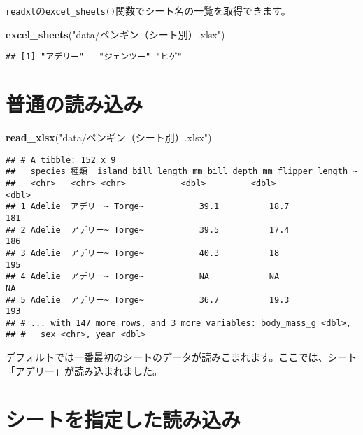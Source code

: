 \documentclass[
  xelatex,ja=standard, b5paper]{bxjsbook}
\newenvironment{Shaded}{\begin{snugshade}}{\end{snugshade}}
\newcommand{\KeywordTok}[1]{\textcolor[rgb]{0.13,0.29,0.53}{\textbf{#1}}}
\newcommand{\NormalTok}[1]{#1}
\newcommand{\StringTok}[1]{\textcolor[rgb]{0.31,0.60,0.02}{#1}}
\begin{document}
\texttt{readxl}の\texttt{excel\_sheets()}関数でシート名の一覧を取得できます。

\begin{Shaded}
\begin{Highlighting}[]
\KeywordTok{excel_sheets}\NormalTok{(}\StringTok{"data/ペンギン（シート別）.xlsx"}\NormalTok{)}
\end{Highlighting}
\end{Shaded}

\begin{verbatim}
## [1] "アデリー"   "ジェンツー" "ヒゲ"
\end{verbatim}

\hypertarget{ux666eux901aux306eux8aadux307fux8fbcux307f}{%
\section{普通の読み込み}\label{ux666eux901aux306eux8aadux307fux8fbcux307f}}

\begin{Shaded}
\begin{Highlighting}[]
\KeywordTok{read_xlsx}\NormalTok{(}\StringTok{"data/ペンギン（シート別）.xlsx"}\NormalTok{)}
\end{Highlighting}
\end{Shaded}

\begin{verbatim}
## # A tibble: 152 x 9
##   species 種類  island bill_length_mm bill_depth_mm flipper_length_~
##   <chr>   <chr> <chr>           <dbl>         <dbl>            <dbl>
## 1 Adelie  アデリー~ Torge~           39.1          18.7              181
## 2 Adelie  アデリー~ Torge~           39.5          17.4              186
## 3 Adelie  アデリー~ Torge~           40.3          18                195
## 4 Adelie  アデリー~ Torge~           NA            NA                 NA
## 5 Adelie  アデリー~ Torge~           36.7          19.3              193
## # ... with 147 more rows, and 3 more variables: body_mass_g <dbl>,
## #   sex <chr>, year <dbl>
\end{verbatim}

デフォルトでは一番最初のシートのデータが読みこまれます。ここでは、シート「アデリー」が読み込まれました。

\hypertarget{ux30b7ux30fcux30c8ux3092ux6307ux5b9aux3057ux305fux8aadux307fux8fbcux307f}{%
\section{シートを指定した読み込み}\label{ux30b7ux30fcux30c8ux3092ux6307ux5b9aux3057ux305fux8aadux307fux8fbcux307f}}
\end{document}
